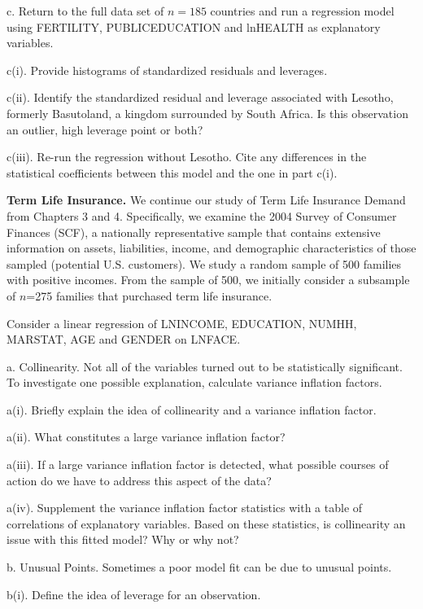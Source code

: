 \begin{exercises}
c. Return to the full data set of $n=185$ countries and run a
regression model using FERTILITY, PUBLICEDUCATION and lnHEALTH as
explanatory variables.

c(i). Provide histograms of standardized residuals and leverages.

c(ii). Identify the standardized residual and leverage associated
with Lesotho, formerly Basutoland, a kingdom surrounded by South
Africa. Is this observation an outlier, high leverage point or both?

c(iii). Re-run the regression without Lesotho. Cite any differences
in the statistical coefficients between this model and the one in
part c(i).



\item \textbf{Term Life Insurance.} We
continue our study of Term Life Insurance Demand from Chapters 3 and
4. Specifically, we examine the 2004 Survey of Consumer Finances
(SCF), a nationally representative sample that contains extensive
information on assets, liabilities, income, and demographic
characteristics of those sampled (potential U.S. customers). We
study a random sample of 500 families with positive incomes. From
the sample of 500, we initially consider a subsample of $n$=275
families that purchased term life insurance.

Consider a linear regression of LNINCOME, EDUCATION, NUMHH, MARSTAT,
AGE and GENDER on LNFACE.


a. Collinearity. Not all of the variables turned out to be
statistically significant. To investigate one possible explanation,
calculate variance inflation factors.

a(i). Briefly explain the idea of collinearity and a variance
inflation factor.

a(ii). What constitutes a large variance inflation factor?

a(iii). If a large variance inflation factor is detected, what
possible courses of action do we have to address this aspect of the
data?

a(iv). Supplement the variance inflation factor statistics with a
table of correlations of explanatory variables.  Based on these
statistics, is collinearity an issue with this fitted model? Why or
why not?


b. Unusual Points. Sometimes a poor model fit can be due to unusual
points.

b(i). Define the idea of leverage for an observation.


\end{exercises}
